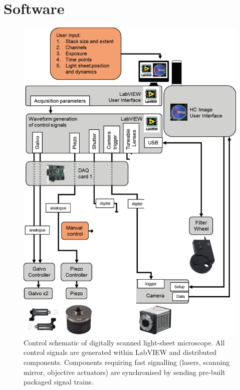 
\section{Software}


\begin{figure}
  \includegraphics{./control} %
  \caption{Control schematic of digitally scanned light-sheet microscope. All control signals are generated within LabVIEW and distributed components. Components requiring fast signalling (lasers, scanning mirror, objective actuators) are synchronised by sending pre-built packaged signal trains.}
  \label{fig:control}
\end{figure}

